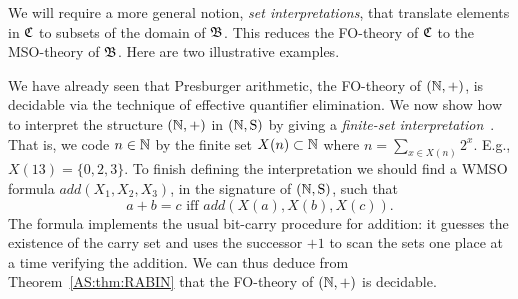 We will require a more general notion, \emph{set interpretations}, that translate elements in $\mathfrak{C}$ to subsets of the domain of $\mathfrak{B}$. This reduces the FO-theory of $\mathfrak{C}$ to the MSO-theory of $\mathfrak{B}$. Here are two illustrative examples.


\begin{example}
We have already seen that Presburger arithmetic, the FO-theory of $(\mathbb{N},+)$, is decidable via the technique of effective quantifier elimination. 
We now show how to interpret the structure $(\mathbb{N},+)$ in $\mbox{$(\mathbb{N},\mathrm{S})$}$ by giving a \emph{finite-set interpretation}~\cite{Robi58,Buch60,Elgo61}. That is, 
we code $n \in \mathbb{N}$ by the finite set $X(n) \subset \mathbb{N}$ where $n = \sum_{x \in X(n)} 2^x$. E.g., $X(13) = \{0,2,3\}$. To finish defining the interpretation we should find a WMSO formula $add(X_1,X_2,X_3)$, in the signature of $\mbox{$(\mathbb{N},\mathrm{S})$}$, such that 
\[
a+b = c \mbox{ iff } add(X(a),X(b),X(c)).
\]
The formula implements the usual bit-carry procedure for addition:
it guesses the existence of the carry set and uses the successor $+1$ to scan the
sets one place at a time verifying the addition. We can thus deduce from Theorem~\ref{AS:thm:RABIN} that the FO-theory of $(\mathbb{N},+)$ is decidable.
\end{example}


